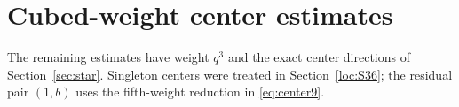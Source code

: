 \section{Cubed-weight center estimates}\label{app:center-moments}
The remaining estimates have weight $q^3$ and the exact center directions of Section~\ref{sec:star}. Singleton centers were treated in Section~\ref{loc:S36}; the residual pair $(1,b)$ uses the fifth-weight reduction in \eqref{eq:center9}.




